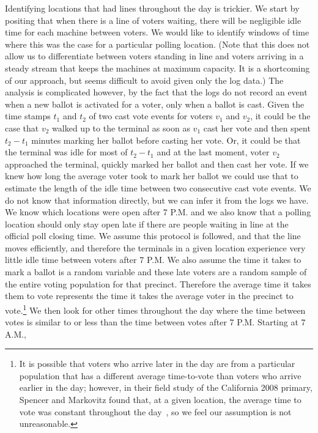 \documentclass[letterpaper,twocolumn,10pt]{article}
\begin{document}
Identifying locations that had lines throughout the day is trickier. We start by
positing that when there is a line of voters waiting, there will be negligible
idle time for each machine between voters. We would like to identify windows of
time where this was the case for a particular polling location. (Note that this
does not allow us to differentiate between voters standing in line and voters
arriving in a steady stream that keeps the machines at maximum capacity. It is a
shortcoming of our approach, but seems difficult to avoid given only the log
data.) The analysis is complicated however, by the fact that the logs do not
record an event when a new ballot is activated for a voter, only when a ballot
is cast. Given the time stamps $t_1$ and $t_2$ of two cast vote events for voters
$v_1$ and $v_2$, it could be the case that $v_2$ walked up to the terminal
as soon as $v_1$ cast her vote and then spent $t_2-t_1$ minutes marking her
ballot before casting her vote. Or, it could be that the terminal was idle for
most of $t_2-t_1$ and at the last moment, voter $v_2$ approached the terminal,
quickly marked her ballot and then cast her vote. If we knew how long the
average voter took to mark her ballot we could use that to estimate the length
of the idle time between two consecutive cast vote events. We do not know that
information directly, but we can infer it from the logs we have. We know which
locations were open after 7 P.M. and we also know that a polling location should
only stay open late if there are people waiting in line at the official poll
closing time. We assume this protocol is followed, and that
the line moves efficiently, and therefore the terminals in a given location
experience very little idle time between voters after 7 P.M. We also assume
the time it takes to mark a ballot is a random variable and these late voters
are a random sample of the entire voting population for that precinct. Therefore
the average time it takes them to vote represents the time it takes the average
voter in the precinct to vote.\footnote{It is possible that voters who arrive later in
the day are from a particular population that has a different average
time-to-vote than voters who arrive earlier in the day; however, in their field
study of the California 2008 primary, Spencer and Markovitz found that, at a
given location, the
average time to vote was constant throughout the day~\cite{Spencer2010}, so we
feel our assumption is not unreasonable.} We 
then look for other times throughout the day where the time between votes is
similar to or less than the time between votes after 7 P.M. Starting at 7 A.M.,
\end{document}
